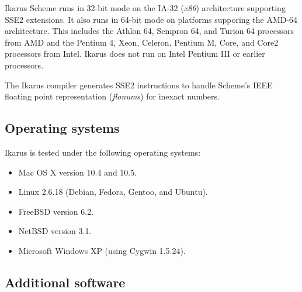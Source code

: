\documentclass[onecolumn, 12pt, twoside, openright, dvipdfm]{book}
\begin{document}
Ikarus Scheme runs in 32-bit mode on the IA-32 (\emph{x86})
architecture supporting SSE2 extensions.  It also runs in 64-bit
mode on platforms supporing the AMD-64 architecture.  This includes
the Athlon 64, Sempron 64, and Turion 64 processors from AMD and the
Pentium 4, Xeon, Celeron, Pentium M, Core, and Core2 processors from
Intel.  Ikarus does not run on Intel Pentium III or earlier
processors.

The Ikarus compiler generates SSE2 instructions to handle Scheme's
IEEE floating point representation (\emph{flonums}) for inexact
numbers. 

\subsection{Operating systems}

Ikarus is tested under the following operating systems:

\begin{itemize}
\item Mac OS X version 10.4 and 10.5.
\item Linux 2.6.18 (Debian, Fedora, Gentoo, and Ubuntu).
\item FreeBSD version 6.2.
\item NetBSD version 3.1.
\item Microsoft Windows XP (using Cygwin 1.5.24).
\end{itemize}

\subsection{Additional software}
\end{document}
